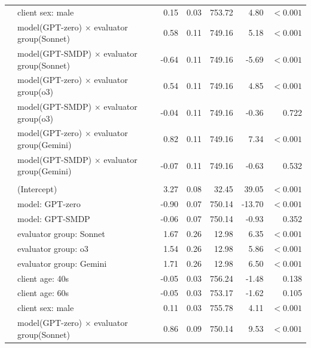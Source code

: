 \documentclass{wiley-article}
\begin{document}
{\begin{longtable}{@{}l p{} rrrrr@{}}
    & client sex: male                                        & 0.15 & 0.03 & 753.72 &   4.80 & $<\!0.001$ \\
    & model(GPT-zero) $\times$ evaluator group(Sonnet)        & 0.58 & 0.11 & 749.16 &   5.18 & $<\!0.001$ \\
    & model(GPT-SMDP) $\times$ evaluator group(Sonnet)        &-0.64 & 0.11 & 749.16 &  -5.69 & $<\!0.001$ \\
    & model(GPT-zero) $\times$ evaluator group(o3)            & 0.54 & 0.11 & 749.16 &   4.85 & $<\!0.001$ \\
    & model(GPT-SMDP) $\times$ evaluator group(o3)            &-0.04 & 0.11 & 749.16 &  -0.36 & 0.722 \\
    & model(GPT-zero) $\times$ evaluator group(Gemini)        & 0.82 & 0.11 & 749.16 &   7.34 & $<\!0.001$ \\
    & model(GPT-SMDP) $\times$ evaluator group(Gemini)        &-0.07 & 0.11 & 749.16 &  -0.63 & 0.532 \\
  \addlinespace
  \multicolumn{7}{l}{\textbf{OVR}}\\
    & (Intercept)                                             & 3.27 & 0.08 &  32.45 &  39.05 & $<\!0.001$ \\
    & model: GPT-zero                                         &-0.90 & 0.07 & 750.14 & -13.70 & $<\!0.001$ \\
    & model: GPT-SMDP                                         &-0.06 & 0.07 & 750.14 &  -0.93 & 0.352 \\
    & evaluator group: Sonnet                                 & 1.67 & 0.26 &  12.98 &   6.35 & $<\!0.001$ \\
    & evaluator group: o3                                     & 1.54 & 0.26 &  12.98 &   5.86 & $<\!0.001$ \\
    & evaluator group: Gemini                                 & 1.71 & 0.26 &  12.98 &   6.50 & $<\!0.001$ \\
    & client age: 40s                                         &-0.05 & 0.03 & 756.24 &  -1.48 & 0.138 \\
    & client age: 60s                                         &-0.05 & 0.03 & 753.17 &  -1.62 & 0.105 \\
    & client sex: male                                        & 0.11 & 0.03 & 755.78 &   4.11 & $<\!0.001$ \\
    & model(GPT-zero) $\times$ evaluator group(Sonnet)        & 0.86 & 0.09 & 750.14 &   9.53 & $<\!0.001$ \\

\end{longtable}}
\end{document}
